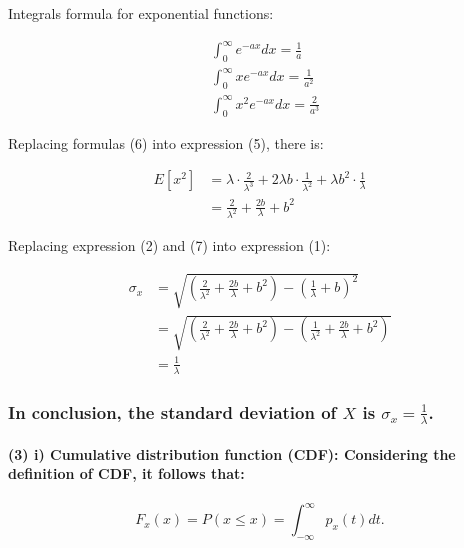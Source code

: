 \documentclass[
]{article}
\begin{document}
Integrals formula for exponential functions:

\[
\begin{align*}
& \int_{0}^{\infty} e^{-a x} d x=\frac{1}{a} \\
& \int_{0}^{\infty} x e^{-a x} d x=\frac{1}{a^{2}} \\
& \int_{0}^{\infty} x^{2} e^{-a x} d x=\frac{2}{a^{3}} \tag{6}
\end{align*}
\]

Replacing formulas (6) into expression (5), there is:

\[
\begin{align*}
E\left[x^{2}\right] & =\lambda \cdot \frac{2}{\lambda^{3}}+2 \lambda b \cdot \frac{1}{\lambda^{2}}+\lambda b^{2} \cdot \frac{1}{\lambda} \\
& =\frac{2}{\lambda^{2}}+\frac{2 b}{\lambda}+b^{2} \tag{7}
\end{align*}
\]

Replacing expression (2) and (7) into expression (1):

\[
\begin{align*}
\sigma_{x} & =\sqrt{\left(\frac{2}{\lambda^{2}}+\frac{2 b}{\lambda}+b^{2}\right)-\left(\frac{1}{\lambda}+b\right)^{2}} \\
& =\sqrt{\left(\frac{2}{\lambda^{2}}+\frac{2 b}{\lambda}+b^{2}\right)-\left(\frac{1}{\lambda^{2}}+\frac{2 b}{\lambda}+b^{2}\right)} \\
& =\frac{1}{\lambda}
\end{align*}
\]

\subsubsection{\texorpdfstring{In conclusion, the standard deviation of
\(X\) is
\(\sigma_{x}=\frac{1}{\lambda}\).}{In conclusion, the standard deviation of X is \textbackslash sigma\_\{x\}=\textbackslash frac\{1\}\{\textbackslash lambda\}.}}\label{in-conclusion-the-standard-deviation-of-x-is-sigma_xfrac1lambda.}

\paragraph{(3) i) Cumulative distribution function (CDF): Considering
the definition of CDF, it follows
that:}\label{i-cumulative-distribution-function-cdf-considering-the-definition-of-cdf-it-follows-that}

\[
\begin{equation}
F_{x}(x)=P(x \leqslant x)=\int_{-\infty}^{\infty} p_{x}(t) d t . \tag{1}
\end{equation}
\]
\end{document}
